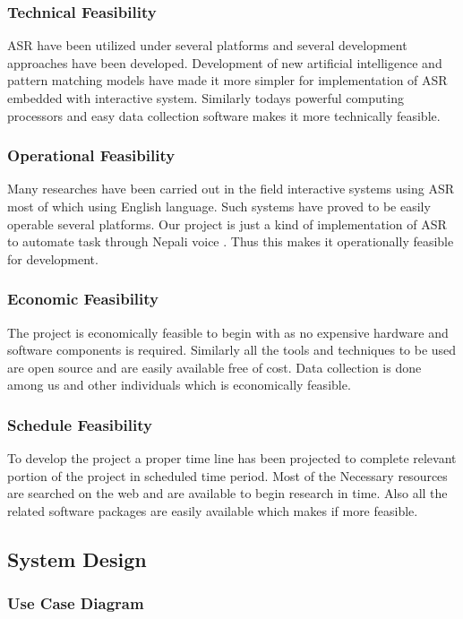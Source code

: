 \subsubsection{Technical Feasibility}
ASR have been utilized under several platforms and several development approaches have been developed. Development of new artificial intelligence and pattern matching models have made it more simpler for implementation of ASR embedded with interactive system. Similarly today\textquotesingle s powerful computing processors and easy data collection software makes it more technically feasible.
\subsubsection{Operational Feasibility}
Many researches have been carried out in the field interactive systems using ASR most of which using English language. Such systems have proved to be easily operable several platforms. Our project is just a kind of implementation of ASR to automate task through Nepali voice . Thus this makes it operationally feasible for development.
\subsubsection{Economic Feasibility}
The project is economically feasible to begin with as no expensive hardware and software components is required. Similarly all the tools and techniques to be used are open source and are easily available free of cost. Data collection is done among us and other individuals which is economically feasible.
\subsubsection{Schedule  Feasibility}
To develop the project a proper time line has been projected to complete relevant portion of the project in scheduled time period. Most of the Necessary resources are  searched on the web and are available to begin research in time. Also all the related software packages are easily available which makes if more feasible.

\subsection{System Design}
\subsubsection{Use Case Diagram}

